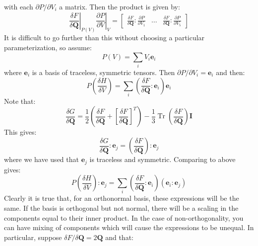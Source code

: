 \documentclass[reqno]{article}
\newcommand{\Q}{\mathbf{Q}}
\newcommand{\I}{\mathbf{I}}
\DeclareMathOperator{\Tr}{Tr}
\begin{document}
with each $\partial P / \partial V_i$ a matrix.
Then the product is given by:
\begin{equation}
    \left. \frac{\delta F}{\delta \Q} \right|_{P(V)}
    \left. \frac{\partial P}{\partial V} \right|_{V}
    =
    \begin{bmatrix}
        \frac{\delta F}{\delta \Q} : \frac{\partial P}{\partial V_1}  
        &\hdots
        &\frac{\delta F}{\delta \Q} : \frac{\partial P}{\partial V_5}
    \end{bmatrix}
\end{equation}
It is difficult to go further than this without choosing a particular parameterization, so assume:
\begin{equation}
    P(V)
    =
    \sum_i V_i \mathbf{e}_i
\end{equation}
where $\mathbf{e}_i$ is a basis of traceless, symmetric tensors.
Then $\partial P / \partial V_i = \mathbf{e}_i$ and then:
\begin{equation}
    P \left( \frac{\delta H}{\delta V} \right)
    =
    \sum_i \left( \frac{\delta F}{\delta \Q} : \mathbf{e}_i \right) \mathbf{e}_i
\end{equation}
Note that:
\begin{equation}
    \frac{\delta G}{\delta \Q}
    =
    \frac12 \left(
        \frac{\delta F}{\delta \Q}
        +
        \left[ \frac{\delta F}{\delta \Q} \right]^T
    \right)
    -
    \frac13 \Tr \left( \frac{\delta F}{\delta \Q} \right) \I
\end{equation}
This gives:
\begin{equation}
    \frac{\delta G}{\delta \Q} : \mathbf{e}_j
    =
    \left( \frac{\delta F}{\delta \Q} \right) : \mathbf{e}_j
\end{equation}
where we have used that $\mathbf{e}_j$ is traceless and symmetric.
Comparing to above gives:
\begin{equation}
    P \left( \frac{\delta H}{\delta V} \right) : \mathbf{e}_j
    =
    \sum_i \left( \frac{\delta F}{\delta \Q} : \mathbf{e}_i \right) \left( \mathbf{e}_i : \mathbf{e}_j \right)
\end{equation}
Clearly it is true that, for an orthonormal basis, these expressions will be the same.
If the basis is orthogonal but not normal, there will be a scaling in the components equal to their inner product. 
In the case of non-orthogonality, you can have mixing of components which will cause the expressions to be unequal.
In particular, suppose $\delta F / \delta \Q = 2\Q$ and that:
\end{document}
